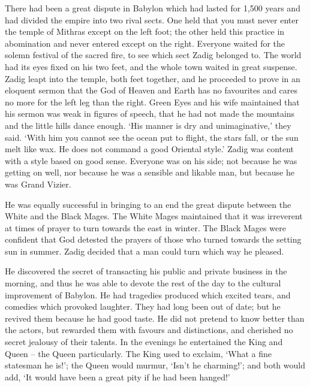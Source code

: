 \documentclass{article}
\begin{document}
\begin{center}
There had been a great dispute in Babylon which had lasted for 1,500 years and 
had divided the empire into two rival sects. One held that you must never enter 
the temple of Mithras except on the left foot; the other held this practice in 
abomination and never entered except on the right. Everyone waited for the solemn 
festival of the sacred fire, to see which sect Zadig belonged to. The world had 
its eyes fixed on his two feet, and the whole town waited in great suspense. Zadig 
leapt into the temple, both feet together, and he proceeded to prove in an eloquent 
sermon that the God of Heaven and Earth has no favourites and cares no more for 
the left leg than the right. Green Eyes and his wife maintained that his sermon 
was weak in figures of speech, that he had not made the mountains and the little 
hills dance enough. `His manner is dry and unimaginative,' they said. `With him 
you cannot see the ocean put to flight, the stars fall, or the sun melt like wax. 
He does not command a good Oriental style.' Zadig was content with a style based 
on good sense. Everyone was on his side; not because he was getting on well, nor 
because he was a sensible and likable man, but because he was Grand Vizier. 

He was equally successful in bringing to an end the great dispute between the White 
and the Black Mages. The White Mages maintained that it was irreverent at times 
of prayer to turn towards the east in winter. The Black Mages were confident that 
God detested the prayers of those who turned towards the setting sun in summer. 
Zadig decided that a man could turn which way he pleased. 

He discovered the secret of transacting his public and private business in the 
morning, and thus he was able to devote the rest of the day to the cultural improvement 
of Babylon. He had tragedies produced which excited tears, and comedies which provoked 
laughter. They had long been out of date; but he revived them because he had good 
taste. He did not pretend to know better than the actors, but rewarded them with 
favours and distinctions, and cherished no secret jealousy of their talents. In 
the evenings he entertained the King and Queen – the Queen particularly. The 
King used to exclaim, `What a fine statesman he is!'; the Queen would murmur, `Isn't 
he charming!'; and both would add, `It would have been a great pity if he had been 
hanged!' 


\end{center}
\end{document}
